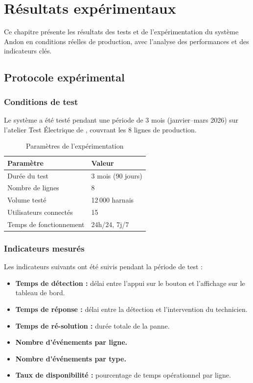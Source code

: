 \chapter{R\'esultats exp\'erimentaux}

Ce chapitre pr\'esente les r\'esultats des tests et de l'exp\'erimentation du syst\`eme Andon en conditions r\'eelles de production, avec l'analyse des performances et des indicateurs cl\'es.

\section{Protocole exp\'erimental}

\subsection{Conditions de test}

Le syst\`eme a \'et\'e test\'e pendant une p\'eriode de 3 mois (janvier--mars 2026) sur l'atelier Test \'Electrique de \sews, couvrant les 8 lignes de production.

\begin{table}[htbp]
\centering
\renewcommand{\arraystretch}{1.3}
\begin{tabular}{l l}
\toprule
\textbf{Param\`etre} & \textbf{Valeur} \\
\midrule
Dur\'ee du test & 3 mois (90 jours) \\
Nombre de lignes & 8 \\
Volume test\'e & 12\,000 harnais \\
Utilisateurs connect\'es & 15 \\
Temps de fonctionnement & 24h/24, 7j/7 \\
\bottomrule
\end{tabular}
\caption{Param\`etres de l'exp\'erimentation}
\label{tab:params_expe}
\end{table}

\subsection{Indicateurs mesur\'es}

Les indicateurs suivants ont \'et\'e suivis pendant la p\'eriode de test :

\begin{itemize}
    \item \textbf{Temps de d\'etection :} d\'elai entre l'appui sur le bouton et l'affichage sur le tableau de bord.
    \item \textbf{Temps de r\'eponse :} d\'elai entre la d\'etection et l'intervention du technicien.
    \item \textbf{Temps de r\'e-solution :} dur\'ee totale de la panne.
    \item \textbf{Nombre d'\'ev\'enements par ligne.}
    \item \textbf{Nombre d'\'ev\'enements par type.}
    \item \textbf{Taux de disponibilit\'e :} pourcentage de temps op\'erationnel par ligne.
\end{itemize}

